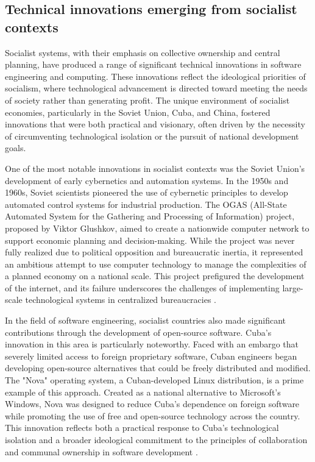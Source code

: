 \begin{refsection}
\subsection{Technical innovations emerging from socialist contexts}

Socialist systems, with their emphasis on collective ownership and central planning, have produced a range of significant technical innovations in software engineering and computing. These innovations reflect the ideological priorities of socialism, where technological advancement is directed toward meeting the needs of society rather than generating profit. The unique environment of socialist economies, particularly in the Soviet Union, Cuba, and China, fostered innovations that were both practical and visionary, often driven by the necessity of circumventing technological isolation or the pursuit of national development goals.

One of the most notable innovations in socialist contexts was the Soviet Union's development of early cybernetics and automation systems. In the 1950s and 1960s, Soviet scientists pioneered the use of cybernetic principles to develop automated control systems for industrial production. The OGAS (All-State Automated System for the Gathering and Processing of Information) project, proposed by Viktor Glushkov, aimed to create a nationwide computer network to support economic planning and decision-making. While the project was never fully realized due to political opposition and bureaucratic inertia, it represented an ambitious attempt to use computer technology to manage the complexities of a planned economy on a national scale. This project prefigured the development of the internet, and its failure underscores the challenges of implementing large-scale technological systems in centralized bureaucracies \cite[pp.~142-145]{gerovitch2004}.

In the field of software engineering, socialist countries also made significant contributions through the development of open-source software. Cuba’s innovation in this area is particularly noteworthy. Faced with an embargo that severely limited access to foreign proprietary software, Cuban engineers began developing open-source alternatives that could be freely distributed and modified. The "Nova" operating system, a Cuban-developed Linux distribution, is a prime example of this approach. Created as a national alternative to Microsoft’s Windows, Nova was designed to reduce Cuba’s dependence on foreign software while promoting the use of free and open-source technology across the country. This innovation reflects both a practical response to Cuba’s technological isolation and a broader ideological commitment to the principles of collaboration and communal ownership in software development \cite[pp.~75-78]{kapcia2008}.


\end{refsection}
